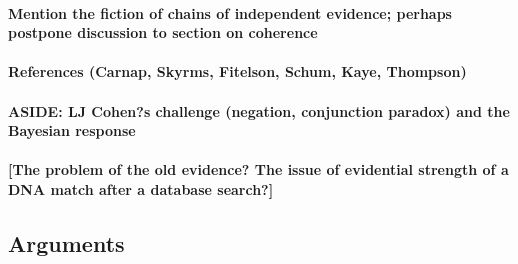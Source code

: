 \documentclass[10pt]{article}
\begin{document}
\begin{comment}
Suppose a witness asserts that $F$ in a court of law, denoted by $A_F$. We are now interested in knowing the 
strength of the evidence $A_F$. This depends on specifying the hypothesis of interest.  
Suppose the hypothesis is that F occurred and the witness did not misremember
nor misperceive, that is, $F\wedge C_F$. The alternative 
hypothesis will be that  F did not occur and the witness did misperceive nor misremember, 
that is, $\neg F \wedge \neg C_F$. The likelihood ratio 
of interest is therefore as follows:
%
\[\frac{P(A_F| F, C_F)}{P( A_F|\neg F, \neg C_F)}=\frac{P(A_F| C_F)}{P(A_F| \neg C_F)}\]
%
The equivalence is based on the idea that $A_F$ immediately depends on whether $C_F$ 
but not on whether $F$. We make assertions depending on our cognitive states, for examples, what we believe or not believe 
or whether we have an interest in lying. Whether a certain fact F occurred does not 
have a direct influence on our assertions (if not indirectly through 
our cognitive states). This, at least, is the assumptions 
about our psychology that justifies the equivalence above. 
\end{comment}


\paragraph{Mention the fiction of chains of independent evidence; perhaps postpone discussion to section on coherence}
		
\paragraph{References (Carnap, Skyrms, Fitelson, Schum, Kaye, Thompson)}
		
\paragraph{ASIDE: LJ Cohen?s challenge (negation, conjunction paradox) and the Bayesian response}

\paragraph{[The problem of the old evidence? The issue of evidential strength of a DNA match after a database search?]}


\subsection{Arguments}
\end{document}
